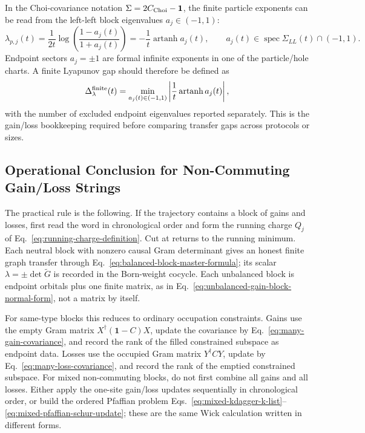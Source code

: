 \documentclass[aps,prb,onecolumn,nofootinbib,superscriptaddress]{revtex4-2}
\newcommand{\I}{\mathbf{1}}
\newcommand{\spec}{\operatorname{spec}}
\newcommand{\artanh}{\operatorname{artanh}}
\theoremstyle{plain}
\theoremstyle{definition}
\begin{document}
In the Choi-covariance notation \(\Sigma=2C_{\rm Choi}-\I\), the finite
particle exponents can be read from the left-left block eigenvalues
\(a_j\in(-1,1)\):
\begin{equation}
  \lambda_{p,j}(t)
  =
  \frac{1}{2t}
  \log\!\left(\frac{1-a_j(t)}{1+a_j(t)}\right)
  =
  -\frac{1}{t}\artanh a_j(t),
  \qquad
  a_j(t)\in\spec\Sigma_{LL}(t)\cap(-1,1).
  \label{eq:particle-exponents-from-choi}
\end{equation}
Endpoint sectors \(a_j=\pm1\) are formal infinite exponents in one of the
particle/hole charts.  A finite Lyapunov gap should therefore be defined as
\begin{equation}
  \Delta_\lambda^{\rm finite}(t)
  =
  \min_{a_j(t)\in(-1,1)}
  \left|
  \frac{1}{t}\artanh a_j(t)
  \right|,
  \label{eq:finite-sector-gap}
\end{equation}
with the number of excluded endpoint eigenvalues reported separately.  This is
the gain/loss bookkeeping required before comparing transfer gaps across
protocols or sizes.


\subsection{Operational Conclusion for Non-Commuting Gain/Loss Strings}
\label{sec:gain-loss-operational-conclusion}

The practical rule is the following.  If the trajectory contains a block of
gains and losses, first read the word in chronological order and form the
running charge \(Q_j\) of Eq.~\eqref{eq:running-charge-definition}.  Cut at
returns to the running minimum.  Each neutral block with nonzero causal Gram
determinant gives an honest finite graph transfer through
Eq.~\eqref{eq:balanced-block-master-formula}; its scalar
\(\lambda=\pm\det\widetilde G\) is recorded in the Born-weight cocycle.  Each
unbalanced block is endpoint orbitals plus one finite matrix, as in
Eq.~\eqref{eq:unbalanced-gain-block-normal-form}, not a matrix by itself.

For same-type blocks this reduces to ordinary occupation constraints.  Gains
use the empty Gram matrix \(X^\dagger(\I-C)X\), update the covariance by
Eq.~\eqref{eq:many-gain-covariance}, and record the rank of the filled
constrained subspace as endpoint data.  Losses use the occupied Gram matrix
\(Y^\dagger C Y\), update by Eq.~\eqref{eq:many-loss-covariance}, and record
the rank of the emptied constrained subspace.  For mixed non-commuting
blocks, do not first combine all gains and all losses.  Either apply the
one-site gain/loss updates sequentially in chronological order, or build the
ordered Pfaffian problem
Eqs.~\eqref{eq:mixed-kdagger-k-list}--\eqref{eq:mixed-pfaffian-schur-update};
these are the same Wick calculation written in different forms.
\end{document}
